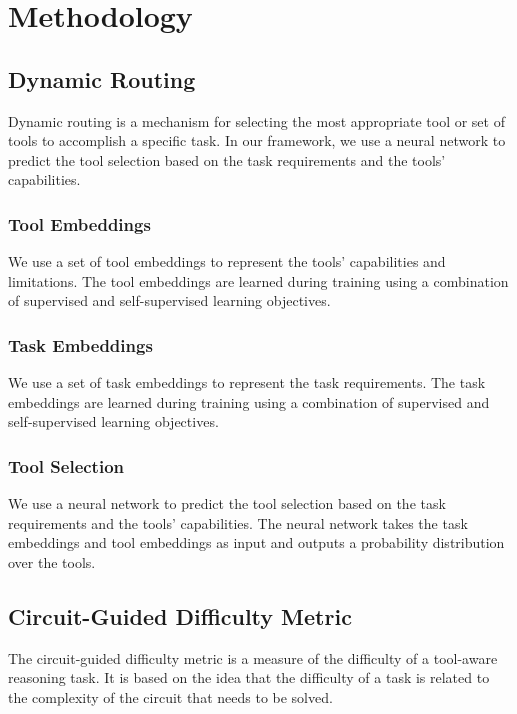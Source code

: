 \documentclass{article}
\begin{document}
\section{Methodology}

\subsection{Dynamic Routing}

Dynamic routing is a mechanism for selecting the most appropriate tool or set of tools to accomplish a specific task. In our framework, we use a neural network to predict the tool selection based on the task requirements and the tools' capabilities.

\subsubsection{Tool Embeddings}

We use a set of tool embeddings to represent the tools' capabilities and limitations. The tool embeddings are learned during training using a combination of supervised and self-supervised learning objectives.

\subsubsection{Task Embeddings}

We use a set of task embeddings to represent the task requirements. The task embeddings are learned during training using a combination of supervised and self-supervised learning objectives.

\subsubsection{Tool Selection}

We use a neural network to predict the tool selection based on the task requirements and the tools' capabilities. The neural network takes the task embeddings and tool embeddings as input and outputs a probability distribution over the tools.

\subsection{Circuit-Guided Difficulty Metric}

The circuit-guided difficulty metric is a measure of the difficulty of a tool-aware reasoning task. It is based on the idea that the difficulty of a task is related to the complexity of the circuit that needs to be solved.
\end{document}

